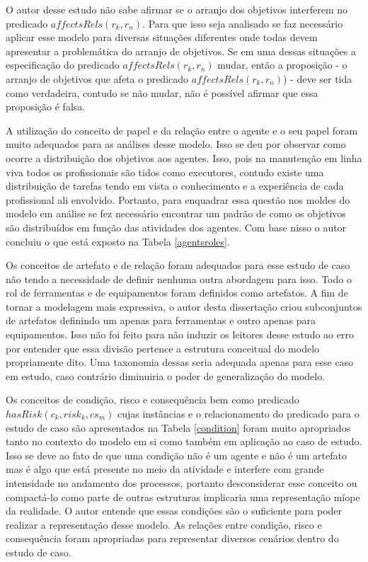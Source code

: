 O autor desse estudo não sabe afirmar se o arranjo dos objetivos interferem no predicado $affectsRels(r_k,r_n)$. Para que isso seja analisado se faz necessário aplicar esse modelo para diversas situações diferentes onde todas devem apresentar a problemática do arranjo de objetivos. Se em uma dessas situações a especificação do predicado $affectsRels(r_k,r_n)$ mudar, então a proposição - o arranjo de objetivos que afeta o predicado $affectsRels(r_k,r_n)$) - deve ser tida como verdadeira, contudo se não mudar, não é possível afirmar que essa proposição é falsa. 

A utilização do conceito de papel e da relação entre o agente e o seu papel foram muito adequados para as análises desse modelo. Isso se deu por observar como ocorre a distribuição dos objetivos aos agentes. Isso, pois na manutenção em linha viva todos os profissionais são tidos como executores, contudo existe uma distribuição de tarefas tendo em vista o conhecimento e a experiência de cada profissional ali envolvido. Portanto, para enquadrar essa questão nos moldes do modelo em análise se fez necessário encontrar um padrão de como os objetivos são distribuídos em função das atividades dos agentes. Com base nisso o autor concluiu o que está exposto na Tabela \ref{agentsroles}.

Os conceitos de artefato e de relação foram adequados para esse estudo de caso não tendo a necessidade de definir nenhuma outra abordagem para isso. Todo o rol de ferramentas e de equipamentos foram definidos como artefatos. A fim de tornar a modelagem mais expressiva, o autor desta dissertação criou subconjuntos de artefatos definindo um apenas para ferramentas e outro apenas para equipamentos. Isso não foi feito para não induzir os leitores desse estudo ao erro por entender que essa divisão pertence a estrutura conceitual do modelo propriamente dito. Uma taxonomia dessas seria adequada apenas para esse caso em estudo, caso contrário diminuiria o poder de generalização do modelo. 

Os conceitos de condição, risco e consequência bem como predicado $hasRisk(c_k,risk_k,cs_m)$ cujas instâncias e o relacionamento do predicado para o estudo de caso são apresentados na Tabela \ref{condition} foram muito apropriados tanto no contexto do modelo em si como também em aplicação ao caso de estudo. Isso se deve ao fato de que uma condição não é um agente e não é um artefato mas é algo que está presente no meio da atividade e interfere com grande intensidade no andamento dos processos, portanto desconsiderar esse conceito ou compactá-lo como parte de outras estruturas implicaria uma representação míope da realidade. O autor entende que essas condições são o suficiente para poder realizar a representação desse modelo. As relações entre condição, risco e consequência foram apropriadas para representar diversos cenários dentro do estudo de caso. 


